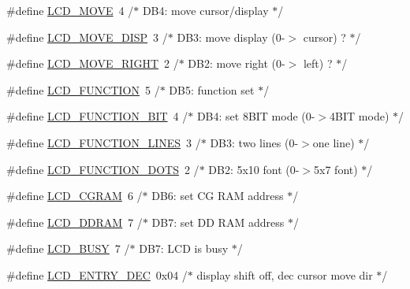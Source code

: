 \begin{DoxyCompactItemize}
\item 
\#define \mbox{\hyperlink{group__pfleury__lcd_ga3f4f758b80fcfa6c9e4db58e2515c78a}{L\+C\+D\+\_\+\+M\+O\+VE}}~4      /$\ast$ D\+B4\+: move cursor/display            $\ast$/
\item 
\#define \mbox{\hyperlink{group__pfleury__lcd_gaaddc2afa9a02bfa748950f2c1e6a204d}{L\+C\+D\+\_\+\+M\+O\+V\+E\+\_\+\+D\+I\+SP}}~3      /$\ast$   D\+B3\+: move display (0-\/$>$ cursor) ?  $\ast$/
\item 
\#define \mbox{\hyperlink{group__pfleury__lcd_ga97cdb19acf109ad52ab4994d2ad02cee}{L\+C\+D\+\_\+\+M\+O\+V\+E\+\_\+\+R\+I\+G\+HT}}~2      /$\ast$   D\+B2\+: move right (0-\/$>$ left) ?      $\ast$/
\item 
\#define \mbox{\hyperlink{group__pfleury__lcd_ga50de1697f1da8ab075a6b4d7aeace64e}{L\+C\+D\+\_\+\+F\+U\+N\+C\+T\+I\+ON}}~5      /$\ast$ D\+B5\+: function set                   $\ast$/
\item 
\#define \mbox{\hyperlink{group__pfleury__lcd_ga91d15d8e3008f6cb141406a8b5d0d3c0}{L\+C\+D\+\_\+\+F\+U\+N\+C\+T\+I\+O\+N\+\_\+B\+IT}}~4      /$\ast$   D\+B4\+: set 8\+B\+I\+T mode (0-\/$>$4\+B\+I\+T mode) $\ast$/
\item 
\#define \mbox{\hyperlink{group__pfleury__lcd_ga6c24806bed18d565917165caa3475463}{L\+C\+D\+\_\+\+F\+U\+N\+C\+T\+I\+O\+N\+\_\+L\+I\+N\+ES}}~3      /$\ast$   D\+B3\+: two lines (0-\/$>$one line)      $\ast$/
\item 
\#define \mbox{\hyperlink{group__pfleury__lcd_ga48de81358277fe4f2810c2b82f90397e}{L\+C\+D\+\_\+\+F\+U\+N\+C\+T\+I\+O\+N\+\_\+D\+O\+TS}}~2      /$\ast$   D\+B2\+: 5x10 font (0-\/$>$5x7 font)      $\ast$/
\item 
\#define \mbox{\hyperlink{group__pfleury__lcd_ga3b38de74c362be1781fef1136aa9684c}{L\+C\+D\+\_\+\+C\+G\+R\+AM}}~6      /$\ast$ D\+B6\+: set CG R\+AM address             $\ast$/
\item 
\#define \mbox{\hyperlink{group__pfleury__lcd_gae54acf3ccc45b7d6be334a03627740c6}{L\+C\+D\+\_\+\+D\+D\+R\+AM}}~7      /$\ast$ D\+B7\+: set DD R\+AM address             $\ast$/
\item 
\#define \mbox{\hyperlink{group__pfleury__lcd_gac8dd1658e235f174d1cabae5c438943d}{L\+C\+D\+\_\+\+B\+U\+SY}}~7      /$\ast$ D\+B7\+: L\+CD is busy                    $\ast$/
\item 
\#define \mbox{\hyperlink{group__pfleury__lcd_gaad56f8e07634e85663f56888ae97089c}{L\+C\+D\+\_\+\+E\+N\+T\+R\+Y\+\_\+\+D\+EC}}~0x04   /$\ast$ display shift off, dec cursor move dir $\ast$/

\end{DoxyCompactItemize}
